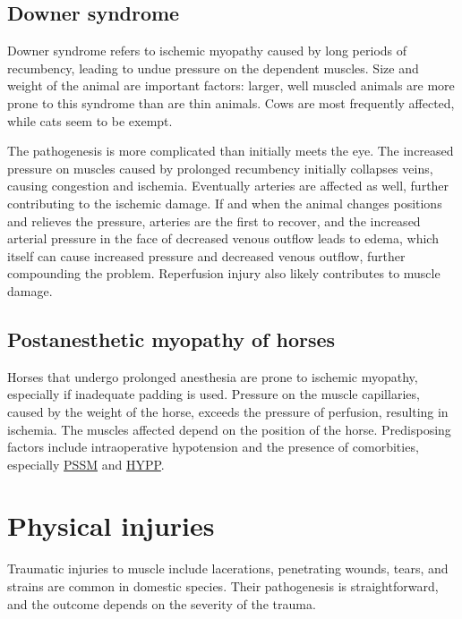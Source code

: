 \documentclass[openany]{report}
\begin{document}
\section{Downer syndrome}\label{downer-syndrome}

Downer syndrome refers to ischemic myopathy caused by long periods of
recumbency, leading to undue pressure on the dependent muscles. Size and
weight of the animal are important factors: larger, well muscled animals
are more prone to this syndrome than are thin animals. Cows are most
frequently affected, while cats seem to be exempt.

The pathogenesis is more complicated than initially meets the eye. The
increased pressure on muscles caused by prolonged recumbency initially
collapses veins, causing congestion and ischemia. Eventually arteries
are affected as well, further contributing to the ischemic damage. If
and when the animal changes positions and relieves the pressure,
arteries are the first to recover, and the increased arterial pressure
in the face of decreased venous outflow leads to edema, which itself can
cause increased pressure and decreased venous outflow, further
compounding the problem. Reperfusion injury also likely contributes to
muscle damage.

\hypertarget{postanesthetic-myopathy-of-horses}{\section{Postanesthetic
myopathy of horses}\label{postanesthetic-myopathy-of-horses}}

Horses that undergo prolonged anesthesia are prone to ischemic myopathy,
especially if inadequate padding is used. Pressure on the muscle
capillaries, caused by the weight of the horse, exceeds the pressure of
perfusion, resulting in ischemia. The muscles affected depend on the
position of the horse. Predisposing factors include intraoperative
hypotension and the presence of comorbities, especially
\protect\hyperlink{equine-polysaccharide-storage-myopathy-pssm}{PSSM}
and \protect\hyperlink{hyperkalemic-periodic-paralysis-hypp}{HYPP}.

\chapter{Physical injuries}\label{physical-injuries}

Traumatic injuries to muscle include lacerations, penetrating wounds,
tears, and strains are common in domestic species. Their pathogenesis is
straightforward, and the outcome depends on the severity of the trauma.
\end{document}
